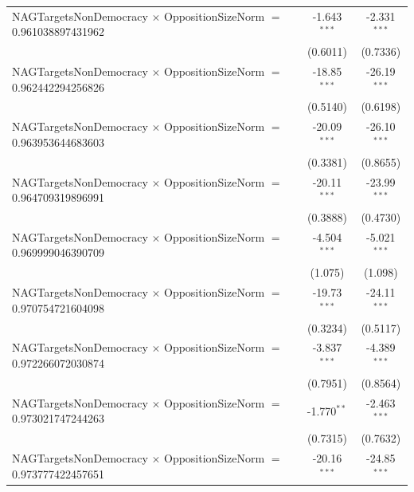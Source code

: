 \begin{tabular}{lcc}
   NAGTargetsNonDemocracy $\times$ OppositionSizeNorm $=$ 0.961038897431962     & -1.643$^{***}$       & -2.331$^{***}$\\   
                                                                                & (0.6011)             & (0.7336)\\   
   NAGTargetsNonDemocracy $\times$ OppositionSizeNorm $=$ 0.962442294256826     & -18.85$^{***}$       & -26.19$^{***}$\\   
                                                                                & (0.5140)             & (0.6198)\\   
   NAGTargetsNonDemocracy $\times$ OppositionSizeNorm $=$ 0.963953644683603     & -20.09$^{***}$       & -26.10$^{***}$\\   
                                                                                & (0.3381)             & (0.8655)\\   
   NAGTargetsNonDemocracy $\times$ OppositionSizeNorm $=$ 0.964709319896991     & -20.11$^{***}$       & -23.99$^{***}$\\   
                                                                                & (0.3888)             & (0.4730)\\   
   NAGTargetsNonDemocracy $\times$ OppositionSizeNorm $=$ 0.969999046390709     & -4.504$^{***}$       & -5.021$^{***}$\\   
                                                                                & (1.075)              & (1.098)\\   
   NAGTargetsNonDemocracy $\times$ OppositionSizeNorm $=$ 0.970754721604098     & -19.73$^{***}$       & -24.11$^{***}$\\   
                                                                                & (0.3234)             & (0.5117)\\   
   NAGTargetsNonDemocracy $\times$ OppositionSizeNorm $=$ 0.972266072030874     & -3.837$^{***}$       & -4.389$^{***}$\\   
                                                                                & (0.7951)             & (0.8564)\\   
   NAGTargetsNonDemocracy $\times$ OppositionSizeNorm $=$ 0.973021747244263     & -1.770$^{**}$        & -2.463$^{***}$\\   
                                                                                & (0.7315)             & (0.7632)\\   
   NAGTargetsNonDemocracy $\times$ OppositionSizeNorm $=$ 0.973777422457651     & -20.16$^{***}$       & -24.85$^{***}$\\   

\end{tabular}
